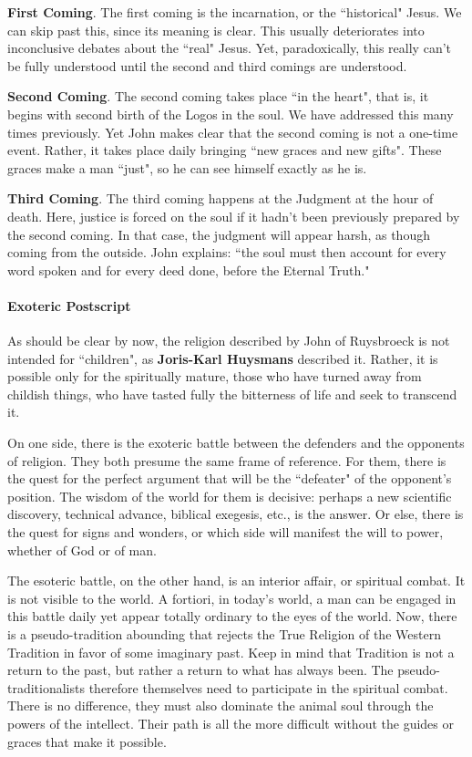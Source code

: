 \textbf{First Coming}. The first coming is the incarnation, or the ``historical" Jesus. We can skip past this, since its meaning is clear. This usually deteriorates into inconclusive debates about the ``real" Jesus. Yet, paradoxically, this really can't be fully understood until the second and third comings are understood.

\textbf{Second Coming}. The second coming takes place ``in the heart", that is, it begins with second birth of the Logos in the soul. We have addressed this many times previously. Yet John makes clear that the second coming is not a one-time event. Rather, it takes place daily bringing ``new graces and new gifts". These graces make a man ``just", so he can see himself exactly as he is.

\textbf{Third Coming}. The third coming happens at the Judgment at the hour of death. Here, justice is forced on the soul if it hadn't been previously prepared by the second coming. In that case, the judgment will appear harsh, as though coming from the outside. John explains: ``the soul must then account for every word spoken and for every deed done, before the Eternal Truth."

\paragraph{Exoteric Postscript}
As should be clear by now, the religion described by John of Ruysbroeck is not intended for ``children", as \textbf{Joris-Karl Huysmans} described it. Rather, it is possible only for the spiritually mature, those who have turned away from childish things, who have tasted fully the bitterness of life and seek to transcend it.

On one side, there is the exoteric battle between the defenders and the opponents of religion. They both presume the same frame of reference. For them, there is the quest for the perfect argument that will be the ``defeater" of the opponent's position. The wisdom of the world for them is decisive: perhaps a new scientific discovery, technical advance, biblical exegesis, etc., is the answer. Or else, there is the quest for signs and wonders, or which side will manifest the will to power, whether of God or of man.

The esoteric battle, on the other hand, is an interior affair, or spiritual combat. It is not visible to the world. A fortiori, in today's world, a man can be engaged in this battle daily yet appear totally ordinary to the eyes of the world. Now, there is a pseudo-tradition abounding that rejects the True Religion of the Western Tradition in favor of some imaginary past. Keep in mind that Tradition is not a return to the past, but rather a return to what has always been. The pseudo-traditionalists therefore themselves need to participate in the spiritual combat. There is no difference, they must also dominate the animal soul through the powers of the intellect. Their path is all the more difficult without the guides or graces that make it possible.



